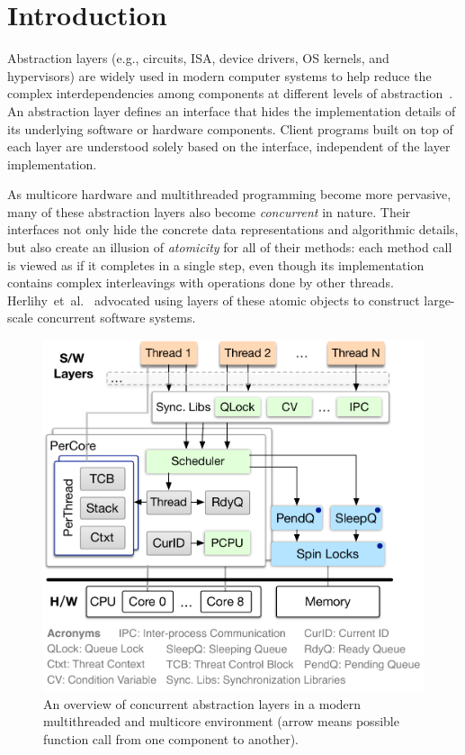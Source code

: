 \section{Introduction}
\label{sec:intro}

Abstraction layers (e.g., circuits, ISA, device drivers, OS kernels,
and hypervisors) are widely used in modern computer
systems to help reduce the complex interdependencies among components
at different levels of abstraction~\cite{salzer09,baldwin00}.  An
abstraction layer defines an interface that hides the implementation
details of its underlying software or hardware components. Client
programs built on top of each layer are understood solely based on
the interface, independent of the layer implementation.

As multicore hardware and multithreaded programming become more
pervasive, many of these abstraction layers also become {\em
  concurrent} in nature.  Their interfaces not only hide the concrete
data representations and algorithmic details, but also create an
illusion of {\em atomicity} for all of their methods: each method call
is viewed as if it completes in a single step, even though its
implementation contains complex interleavings with operations done by
other threads.  Herlihy~{et~al.}~\cite{herlihy90,Herlihy08book}
advocated using layers of these atomic objects to 
construct large-scale concurrent software systems.


\begin{figure}
\centering
\includegraphics[scale=.5]{figs/ccal/sys_arch}
\caption{An overview of concurrent abstraction layers in a modern
  multithreaded and multicore environment (arrow means
  possible function call from one component to another).}
\label{fig:arch}
\end{figure}

